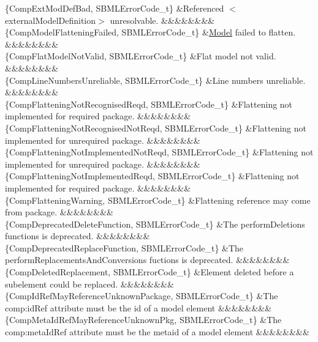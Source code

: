 \begin{DoxyParagraph}{}
\begin{longtabu}
\{Comp\+Ext\+Mod\+Def\+Bad, S\+B\+M\+L\+Error\+Code\+\_\+t\} &Referenced {\ttfamily $<$external\+Model\+Definition$>$} unresolvable. &&&&&&&&\\
\{Comp\+Model\+Flattening\+Failed, S\+B\+M\+L\+Error\+Code\+\_\+t\} &\hyperlink{class_model}{Model} failed to flatten. &&&&&&&&\\
\{Comp\+Flat\+Model\+Not\+Valid, S\+B\+M\+L\+Error\+Code\+\_\+t\} &Flat model not valid. &&&&&&&&\\
\{Comp\+Line\+Numbers\+Unreliable, S\+B\+M\+L\+Error\+Code\+\_\+t\} &Line numbers unreliable. &&&&&&&&\\
\{Comp\+Flattening\+Not\+Recognised\+Reqd, S\+B\+M\+L\+Error\+Code\+\_\+t\} &Flattening not implemented for required package. &&&&&&&&\\
\{Comp\+Flattening\+Not\+Recognised\+Not\+Reqd, S\+B\+M\+L\+Error\+Code\+\_\+t\} &Flattening not implemented for unrequired package. &&&&&&&&\\
\{Comp\+Flattening\+Not\+Implemented\+Not\+Reqd, S\+B\+M\+L\+Error\+Code\+\_\+t\} &Flattening not implemented for unrequired package. &&&&&&&&\\
\{Comp\+Flattening\+Not\+Implemented\+Reqd, S\+B\+M\+L\+Error\+Code\+\_\+t\} &Flattening not implemented for required package. &&&&&&&&\\
\{Comp\+Flattening\+Warning, S\+B\+M\+L\+Error\+Code\+\_\+t\} &Flattening reference may come from package. &&&&&&&&\\
\{Comp\+Deprecated\+Delete\+Function, S\+B\+M\+L\+Error\+Code\+\_\+t\} &The perform\+Deletions functions is deprecated. &&&&&&&&\\
\{Comp\+Deprecated\+Replace\+Function, S\+B\+M\+L\+Error\+Code\+\_\+t\} &The perform\+Replacements\+And\+Conversions fuctions is deprecated. &&&&&&&&\\
\{Comp\+Deleted\+Replacement, S\+B\+M\+L\+Error\+Code\+\_\+t\} &Element deleted before a subelement could be replaced. &&&&&&&&\\
\{Comp\+Id\+Ref\+May\+Reference\+Unknown\+Package, S\+B\+M\+L\+Error\+Code\+\_\+t\} &The \textquotesingle{}comp\+:id\+Ref\textquotesingle{} attribute must be the \textquotesingle{}id\textquotesingle{} of a model element &&&&&&&&\\
\{Comp\+Meta\+Id\+Ref\+May\+Reference\+Unknown\+Pkg, S\+B\+M\+L\+Error\+Code\+\_\+t\} &The \textquotesingle{}comp\+:meta\+Id\+Ref\textquotesingle{} attribute must be the \textquotesingle{}metaid\textquotesingle{} of a model element &&&&&&&&\\

\end{longtabu}
\end{DoxyParagraph}
